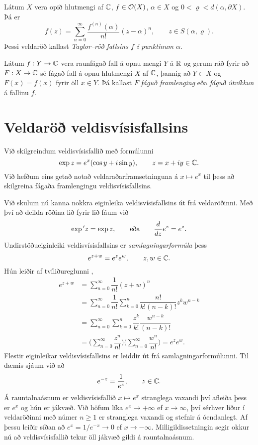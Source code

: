 \begin{se}\label{se:2.3.7}  
Látum $X$ vera opið hlutmengi af ${\mathbb C}$, $f\in {\cal O}(X)$, $\alpha\in
X$ og $0<\varrho<d(\alpha,\partial X)$.  Þá er 
 $$f(z)= \sum\limits_{n=0}^\infty \dfrac
{f^{(n)}(\alpha)}{n!}(z-\alpha)^n, \qquad z\in S(\alpha,\varrho).
 $$
Þessi veldaröð kallast {\it
Taylor--röð
fallsins $f$ í punktinum $\alpha$}.
\end{se}

\begin{sk}
Látum $f:Y\to {\mathbb C}$ vera raunfágað fall á opnu mengi $Y$ á ${\mathbb R}$
og gerum ráð fyrir að $F:X\to {\mathbb C}$ sé fágað fall á opnu hlutmengi $X$ af
${\mathbb C}$, þannig að $Y\subset X$ og $F(x)=f(x)$ fyrir öll $x\in Y$.  Þá
kallast $F$ {\it fáguð framlenging} eða {\it
fáguð útvíkkun}
á fallinu $f$.  
\end{sk}
 
 
\section{Veldaröð veldisvísisfallsins}



\noindent
Við skilgreindum  veldisvísisfallið  með formúlunni
$$
\exp z=e^x(\cos y+i\sin y), \qquad z=x+iy \in {\mathbb C}.
$$
Við hefðum eins getað notað veldaraðarframsetninguna á $x\mapsto e^x$
til þess að skilgreina fágaða framlengingu veldisvísisfallsins.

\smallskip
Við skulum nú kanna nokkra eiginleika veldisvísisfallsins út frá
veldaröðinni.   
Með því að
deilda röðina lið fyrir lið fáum við 
 $$\exp{\sp{\prime}} z=\exp z, \qquad \text{eða} \qquad \dfrac d{dz}e^z=e^z.
 $$
Undirstöðueiginleiki veldisvísisfallsins er {\it
samlagningarformúla
} þess
$$ e^{z+w}=e^ze^w, \qquad z,w\in {\mathbb C}. $$
Hún leiðir af tvíliðureglunni ,
\begin{align*}
e^{z+w}&=\sum_{n=0}^\infty\dfrac 1{n!}(z+w)^n\\
&=\sum_{n=0}^\infty\dfrac 1{n!}\sum_{k=0}^n \dfrac{n!}{k!(n-k)!}z^kw^{n-k}\\
&=\sum_{n=0}^\infty\sum_{k=0}^n \dfrac {z^k}{k!}\dfrac {w^{n-k}}{(n-k)!}\\
&=\bigg(\sum_{n=0}^\infty \dfrac {z^n}{n!}\bigg)\bigg(\sum_{n=0}^\infty\dfrac
{w^{n}}{n!}\bigg)=e^ze^w. 
\end{align*}
Flestir eiginleikar veldisvísisfallsins er leiddir út frá
samlagningarformúlunni.  Til dæmis sjáum við að 
 \begin{equation*}e^{-z}=\dfrac 1{e^z}, \qquad z\in {\mathbb C}.\label{4.5.1}
 \end{equation*}
Á rauntalnaásnum er veldisvísisfallið $x\mapsto e^x$
stranglega vaxandi því afleiða þess er $e^x$ og hún er jákvæð.
Við höfum líka $e^x\to+\infty$ ef
$x\to \infty$, því sérhver liður í veldaröðinni með
númer $n\geq 1$ er stranglega vaxandi og stefnir á óendanlegt. Af
þessu leiðir síðan að $e^{x}=1/e^{-x}\to 0$ ef $x\to -\infty$.
Milligildissetningin segir okkur nú að veldisvísisfallið tekur öll
jákvæð gildi á rauntalnaásnum.  




